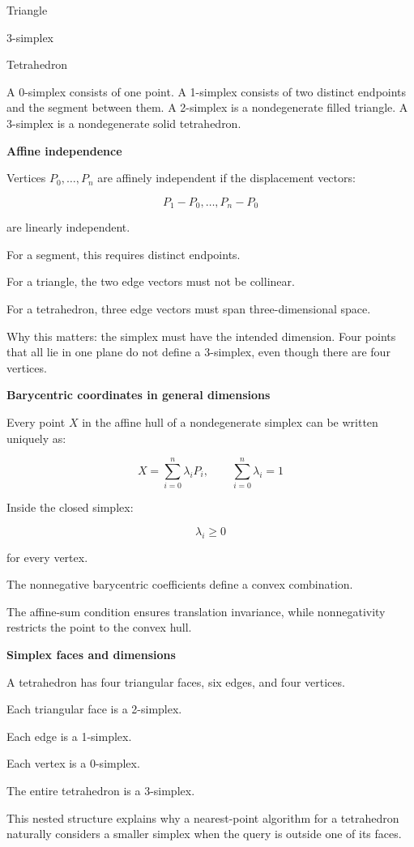 Triangle

3-simplex

Tetrahedron

A 0-simplex consists of one point. A 1-simplex consists of two distinct endpoints and the segment between them. A 2-simplex is a nondegenerate filled triangle. A 3-simplex is a nondegenerate solid tetrahedron.

\textbf{Affine independence}

Vertices \(P_0,\ldots,P_n\) are affinely independent if the displacement vectors:

\[
P_1-P_0,\ldots,P_n-P_0
\]

are linearly independent.

For a segment, this requires distinct endpoints.

For a triangle, the two edge vectors must not be collinear.

For a tetrahedron, three edge vectors must span three-dimensional space.

Why this matters: the simplex must have the intended dimension. Four points that all lie in one plane do not define a 3-simplex, even though there are four vertices.

\textbf{Barycentric coordinates in general dimensions}

Every point \(X\) in the affine hull of a nondegenerate simplex can be written uniquely as:

\[
\boxed{ X=\sum_{i=0}^{n}\lambda_iP_i,\qquad \sum_{i=0}^{n}\lambda_i=1 }
\]

Inside the closed simplex:

\[
\lambda_i\ge0
\]

for every vertex.

The nonnegative barycentric coefficients define a convex combination.

The affine-sum condition ensures translation invariance, while nonnegativity restricts the point to the convex hull.

\textbf{Simplex faces and dimensions}

A tetrahedron has four triangular faces, six edges, and four vertices.

Each triangular face is a 2-simplex.

Each edge is a 1-simplex.

Each vertex is a 0-simplex.

The entire tetrahedron is a 3-simplex.

This nested structure explains why a nearest-point algorithm for a tetrahedron naturally considers a smaller simplex when the query is outside one of its faces.

